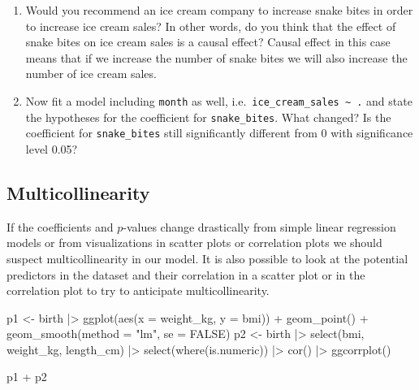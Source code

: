 \documentclass[
  letterpaper,
  DIV=11,
  numbers=noendperiod]{scrreprt}
\newenvironment{Shaded}{\begin{snugshade}}{\end{snugshade}}
\newcommand{\AttributeTok}[1]{\textcolor[rgb]{0.40,0.45,0.13}{#1}}
\newcommand{\ConstantTok}[1]{\textcolor[rgb]{0.56,0.35,0.01}{#1}}
\newcommand{\FunctionTok}[1]{\textcolor[rgb]{0.28,0.35,0.67}{#1}}
\newcommand{\NormalTok}[1]{\textcolor[rgb]{0.00,0.23,0.31}{#1}}
\newcommand{\OtherTok}[1]{\textcolor[rgb]{0.00,0.23,0.31}{#1}}
\newcommand{\SpecialCharTok}[1]{\textcolor[rgb]{0.37,0.37,0.37}{#1}}
\newcommand{\StringTok}[1]{\textcolor[rgb]{0.13,0.47,0.30}{#1}}
\providecommand{\tightlist}{%
  \setlength{\itemsep}{0pt}\setlength{\parskip}{0pt}}\usepackage{longtable,booktabs,array}
\begin{document}
\begin{enumerate}
\def\labelenumi{\arabic{enumi}.}
\setcounter{enumi}{1}
\tightlist
\item
  Would you recommend an ice cream company to increase snake bites in
  order to increase ice cream sales? In other words, do you think that
  the effect of snake bites on ice cream sales is a causal effect?
  Causal effect in this case means that if we increase the number of
  snake bites we will also increase the number of ice cream sales.
\item
  Now fit a model including \texttt{month} as well,
  i.e.~\texttt{ice\_cream\_sales\ \textasciitilde{}\ .} and state the
  hypotheses for the coefficient for \texttt{snake\_bites}. What
  changed? Is the coefficient for \texttt{snake\_bites} still
  significantly different from 0 with significance level 0.05?
\end{enumerate}

\subsection{Multicollinearity}\label{multicollinearity}

If the coefficients and \(p\)-values change drastically from simple
linear regression models or from visualizations in scatter plots or
correlation plots we should suspect multicollinearity in our model. It
is also possible to look at the potential predictors in the dataset and
their correlation in a scatter plot or in the correlation plot to try to
anticipate multicollinearity.

\begin{Shaded}
\begin{Highlighting}[]
\NormalTok{p1 }\OtherTok{\textless{}{-}}\NormalTok{ birth }\SpecialCharTok{|\textgreater{}} 
  \FunctionTok{ggplot}\NormalTok{(}\FunctionTok{aes}\NormalTok{(}\AttributeTok{x =}\NormalTok{ weight\_kg, }\AttributeTok{y =}\NormalTok{ bmi)) }\SpecialCharTok{+}
  \FunctionTok{geom\_point}\NormalTok{() }\SpecialCharTok{+}
  \FunctionTok{geom\_smooth}\NormalTok{(}\AttributeTok{method =} \StringTok{"lm"}\NormalTok{, }\AttributeTok{se =} \ConstantTok{FALSE}\NormalTok{)}
\NormalTok{p2 }\OtherTok{\textless{}{-}}\NormalTok{ birth }\SpecialCharTok{|\textgreater{}} 
  \FunctionTok{select}\NormalTok{(bmi, weight\_kg, length\_cm) }\SpecialCharTok{|\textgreater{}} 
  \FunctionTok{select}\NormalTok{(}\FunctionTok{where}\NormalTok{(is.numeric)) }\SpecialCharTok{|\textgreater{}} 
  \FunctionTok{cor}\NormalTok{() }\SpecialCharTok{|\textgreater{}} 
  \FunctionTok{ggcorrplot}\NormalTok{()}

\NormalTok{p1 }\SpecialCharTok{+}\NormalTok{ p2}
\end{Highlighting}
\end{Shaded}
\end{document}
